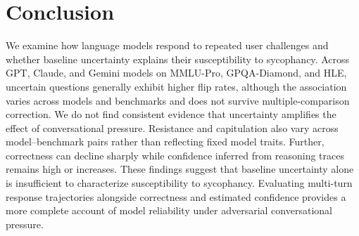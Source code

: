\section{Conclusion}
We examine how language models respond to repeated user challenges and whether baseline uncertainty explains their susceptibility to sycophancy. Across GPT, Claude, and Gemini models on MMLU-Pro, GPQA-Diamond, and HLE, uncertain questions generally exhibit higher flip rates, although the association varies across models and benchmarks and does not survive multiple-comparison correction. We do not find consistent evidence that uncertainty amplifies the effect of conversational pressure. Resistance and capitulation also vary across model--benchmark pairs rather than reflecting fixed model traits. Further, correctness can decline sharply while confidence inferred from reasoning traces remains high or increases. These findings suggest that baseline uncertainty alone is insufficient to characterize susceptibility to sycophancy. Evaluating multi-turn response trajectories alongside correctness and estimated confidence provides a more complete account of model reliability under adversarial conversational pressure.
